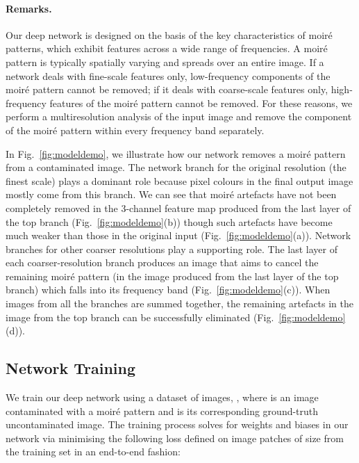 \documentclass[journal]{IEEEtran}
\begin{document}
\begin{table}[thb!]
\end{table}


\paragraph{Remarks.} Our deep network is designed on the basis of the key characteristics of moir\'{e} patterns, which exhibit features across a wide range of frequencies. A moir\'{e} pattern is typically spatially varying and spreads over an entire image. If a network deals with fine-scale features only, low-frequency components of the moir\'{e} pattern cannot be removed; if it deals with coarse-scale features only, high-frequency features of the moir\'{e} pattern cannot be removed. For these reasons, we perform a multiresolution analysis of the input image and remove the component of the moir\'{e} pattern within every frequency band separately.

In Fig.~\ref{fig:modeldemo}, we illustrate how our network removes a moir\'{e} pattern from a contaminated image. The network branch for the original resolution (the finest scale) plays a dominant role because pixel colours in the final output image mostly come from this branch. We can see that moir\'{e} artefacts have not been completely removed in the 3-channel feature map produced from the last layer of the top branch (Fig.~\ref{fig:modeldemo}(b)) though such artefacts have become much weaker than those in the original input (Fig.~\ref{fig:modeldemo}(a)). Network branches for other coarser resolutions play a supporting role. The last layer of each coarser-resolution branch produces an image that aims to cancel the remaining moir\'{e} pattern (in the image produced from the last layer of the top branch) which falls into its frequency band (Fig.~\ref{fig:modeldemo}(c)). When images from all the branches are summed together, the remaining artefacts in the image from the top branch can be successfully eliminated (Fig.~\ref{fig:modeldemo}(d)).

\subsection{Network Training}
We train our deep network using a dataset of images, , where  is an image contaminated with a moir\'{e} pattern and  is its corresponding ground-truth uncontaminated image.  The training process solves for weights  and biases  in our network via minimising the following  loss defined on image patches of size  from the training set  in an end-to-end fashion:
\end{document}
